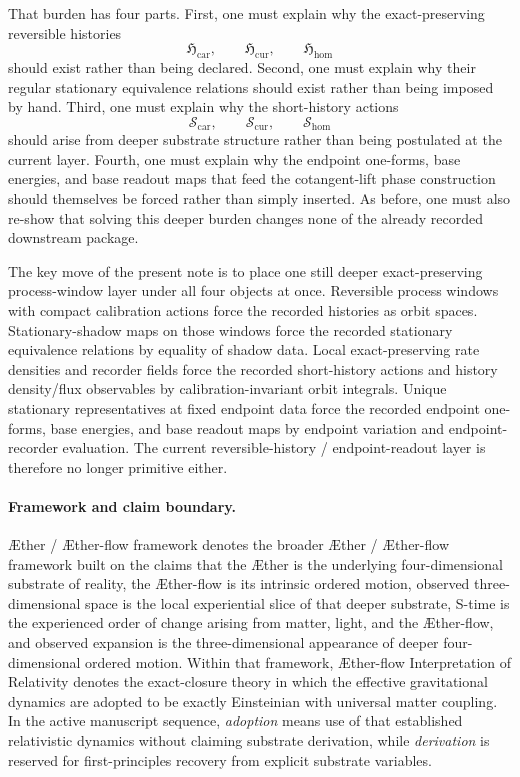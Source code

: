 \documentclass[11pt]{article}
\newcommand{\Aether}{\AE{}ther}
\newcommand{\Aflow}{\AE{}ther-flow}
\newcommand{\TheoryName}{\Aflow{} Interpretation of Relativity}
\newcommand{\TheoryProgram}{\Aether{} / \Aflow{} framework}
\newcommand{\TensorHistoryClass}{\mathfrak H_{\mathrm{car}}}
\newcommand{\CurHistoryClass}{\mathfrak H_{\mathrm{cur}}}
\newcommand{\HomHistoryClass}{\mathfrak H_{\mathrm{hom}}}
\newcommand{\TensorHistoryAction}{\mathscr S_{\mathrm{car}}}
\newcommand{\CurHistoryAction}{\mathscr S_{\mathrm{cur}}}
\newcommand{\HomHistoryAction}{\mathscr S_{\mathrm{hom}}}
\begin{document}
That burden has four parts. First, one must explain why the exact-preserving reversible histories
\[
\TensorHistoryClass,\qquad
\CurHistoryClass,\qquad
\HomHistoryClass
\]
should exist rather than being declared. Second, one must explain why their regular stationary equivalence relations should exist rather than being imposed by hand. Third, one must explain why the short-history actions
\[
\TensorHistoryAction,\qquad
\CurHistoryAction,\qquad
\HomHistoryAction
\]
should arise from deeper substrate structure rather than being postulated at the current layer. Fourth, one must explain why the endpoint one-forms, base energies, and base readout maps that feed the cotangent-lift phase construction should themselves be forced rather than simply inserted. As before, one must also re-show that solving this deeper burden changes none of the already recorded downstream package.

The key move of the present note is to place one still deeper exact-preserving process-window layer under all four objects at once. Reversible process windows with compact calibration actions force the recorded histories as orbit spaces. Stationary-shadow maps on those windows force the recorded stationary equivalence relations by equality of shadow data. Local exact-preserving rate densities and recorder fields force the recorded short-history actions and history density/flux observables by calibration-invariant orbit integrals. Unique stationary representatives at fixed endpoint data force the recorded endpoint one-forms, base energies, and base readout maps by endpoint variation and endpoint-recorder evaluation. The current reversible-history / endpoint-readout layer is therefore no longer primitive either.

\paragraph{Framework and claim boundary.}
\TheoryProgram{} denotes the broader \Aether{} / \Aflow{} framework built on the claims that the \Aether{} is the underlying four-dimensional substrate of reality, the \Aflow{} is its intrinsic ordered motion, observed three-dimensional space is the local experiential slice of that deeper substrate, S-time is the experienced order of change arising from matter, light, and the \Aflow{}, and observed expansion is the three-dimensional appearance of deeper four-dimensional ordered motion. Within that framework, \TheoryName{} denotes the exact-closure theory in which the effective gravitational dynamics are adopted to be exactly Einsteinian with universal matter coupling. In the active manuscript sequence, \emph{adoption} means use of that established relativistic dynamics without claiming substrate derivation, while \emph{derivation} is reserved for first-principles recovery from explicit substrate variables.
\end{document}
